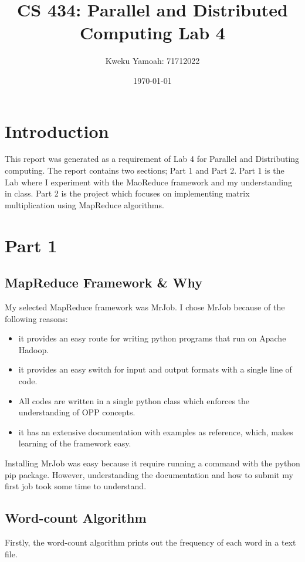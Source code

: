 \documentclass[12pt, a4paper, fleqn, titlepage]{article}
\title{\textbf{CS 434: Parallel and Distributed Computing Lab 4}}
\author{Kweku Yamoah: 71712022}
\date{\today}
\begin{document}
\maketitle
\section*{Introduction}
    This report was generated as a requirement of Lab 4 for Parallel and Distributing computing. The report contains two sections; Part 1 and Part 2. Part 1 is the Lab where I experiment with the MaoReduce framework and my understanding in class. Part 2 is the project which focuses on implementing matrix multiplication using MapReduce algorithms. 
\section*{Part 1}
    \subsection*{MapReduce Framework \& Why}
    My selected MapReduce framework was MrJob. I chose MrJob because of the following reasons:
        \begin{itemize}
            \item it provides an easy route for writing python programs that run on Apache Hadoop.
            \item it provides an easy switch for input and output formats with a single line of code.
            \item All codes are written in a single python class which enforces the understanding of OPP concepts.
            \item it has an extensive documentation with examples as reference, which, makes learning of the framework easy.
        \end{itemize}
    Installing MrJob was easy because it require running a command with the python pip package. However, understanding the documentation and how to submit my first job took some time to understand.

    \subsection*{Word-count Algorithm}
        Firstly, the word-count algorithm prints out the frequency of each word in a text file.
\end{document}
